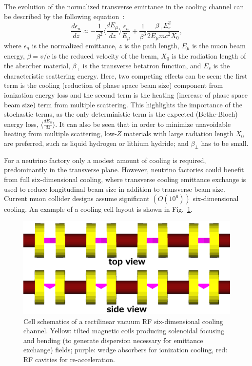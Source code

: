 \documentclass[a4paper,11pt]{article}
\begin{document}
The evolution of the normalized transverse emittance in the cooling channel can be 
described by the following equation~\cite{neuffer}:
\begin{equation}
\frac{d\epsilon_{n}}{dz} \approx -\frac{1}{\beta^{2}}
\langle\frac{dE_{\mu}}{dz}\rangle \frac{\epsilon_{n}}{E_{\mu}}+\frac{1}{\beta^{3}}\frac{\beta_{\perp}E_{s}^{2}}{2E_{\mu}mc^{2}X_{0}},
\label{eq:cooling}
\end{equation}
where $\epsilon_{n}$ is the normalized emittance, $z$ is the path length, $E_{\mu}$ is the muon beam energy, $\beta=v/c$ is the reduced velocity of the beam, $X_{0}$ is the radiation length of the absorber material, $\beta_{\perp}$ is the transverse betatron function, and $E_s$ is the characteristic scattering energy. Here, two competing effects can be seen: the first term is the cooling (reduction of phase space beam size) component from ionization energy loss and the second term is the heating (increase of phase space beam size) term from multiple scattering. This highlights the importance of the stochastic terms, as the only deterministic term is the expected (Bethe-Bloch) energy loss, $\langle\frac{dE_{\mu}}{dz}\rangle$. It can also be seen that in order to minimize unavoidable heating from multiple scattering, low-$Z$ materials with large radiation length $X_0$ are preferred, such as liquid hydrogen or lithium hydride; and $\beta_\perp$ has to be small.
\fi







For a neutrino factory only a modest amount of cooling is required, predominantly in the transverse plane. However, neutrino factories could benefit from full six-dimensional cooling, where transverse cooling emittance exchange is used to reduce longitudinal beam size in addition to transverse beam size. Current muon collider designs assume significant $\left(O(10^6)\right)$ six-dimensional cooling. An example of a cooling cell layout is shown in Fig.~\ref{fig:vcc}.

\begin{figure}[htb] 
\centering
\includegraphics[width=\columnwidth]{Figures/vcc}
\caption{Cell schematics of a rectilinear vacuum RF six-dimensional cooling channel. Yellow: tilted magnetic coils producing solenoidal focusing and bending (to generate dispersion necessary for emittance exchange) fields; purple: wedge absorbers for ionization cooling, red: RF cavities for re-acceleration.}
\label{fig:vcc}
\end{figure}
\end{document}
